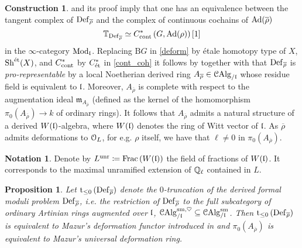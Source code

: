 \documentclass[10pt,a4paper]{amsart}
\numberwithin{equation}{subsection}
\theoremstyle{plain}
\newtheorem{prop}[theorem]{Proposition}
\theoremstyle{definition}
\newtheorem{notation}[theorem]{Notation}
\newtheorem{construction}[theorem]{Construction}
\theoremstyle{remark}
\numberwithin{equation}{section}
\begin{document}
\begin{construction}
\cite[Proposition 4.2.6]{me1} and its proof imply that one has an equivalence between the tangent complex of $\mathbf{\mathrm{Def}}_{\overline{\rho}}$ and the complex of continuous cochains of $\mathrm{Ad} ( \overline \rho)$
	\begin{equation} \label{cont_coh}
		\mathbb T_{\mathbf{\mathrm{Def}}_{\overline{\rho}}} \simeq C^*_{\mathrm{cont}} \left( G, \mathrm{Ad}( \rho ) \right)[1]
	\end{equation}
in the $\infty$-category $\mathrm{Mod}_\mathfrak l$. 
Replacing $\mathrm B G$ in \eqref{deform} by \'etale homotopy type of $X$, $\mathrm{Sh}^{\text{\'et}}(X)$, and $C^*_{\mathrm{cont}}$ by $C^*_{\text{\'et}}$ in \eqref{cont_coh} it follows by \cite[Theorem 19.1]{milne_et} together with \cite[Theorem 6.2.5]{lurieDAGXII} that $
\mathbf{\mathrm{Def}}_{\overline{\rho}}$ is \emph{pro-representable} by
a local Noetherian derived ring $A_{\overline{\rho}} \in \mathcal{C}\mathrm{Alg}_{/ \mathfrak l}$ whose residue field is equivalent to $\mathfrak l$. Moreover, $A_{\overline{\rho}}$ is complete with respect to the augmentation ideal $\mathfrak{m}_{A_{\overline{\rho}}}$
(defined as the kernel of the homomorphism $\pi_0 \left(  A_{\overline{\rho}} \right) \to k$ of ordinary rings).
It follows that $A_{\overline{\rho}}$ admits a natural structure of a derived $W(\mathfrak l)$-algebra, where $W(\mathfrak l)$ denotes the ring of Witt vector of $\mathfrak l$.
As $\overline{\rho}$ admits deformations to $\mathcal{O}_L$, for e.g. $\rho$ itself, we have that $\ell \neq 0 $ in $\pi_0(A_{\overline{\rho}})$.
\end{construction}

\begin{notation}
Denote by $L^{\mathrm{unr}} \coloneqq \mathrm{Frac} \left( W(\mathfrak l) \right)$ the field of fractions of $W(\mathfrak l)$. It corresponds to the maximal unramified extension of $\mathbb{Q}_\ell$ contained in $L$.
\end{notation}

\begin{prop}
Let $\mathrm t_{\leq 0} \left( \mathbf{\mathrm{Def}}_{\overline{\rho}} \right)$ denote the $0$-truncation of the derived formal moduli problem $\mathbf{\mathrm{Def}}_{\overline{\rho}}$, i.e. the restriction of $\mathbf{\mathrm{Def}}_{\overline{\rho}}$ to the full subcategory of ordinary Artinian rings augmented over $\mathfrak l$,
$\mathcal{C}\mathrm{Alg}_{/ \mathfrak l }^{\mathrm{sm},\heartsuit} \subseteq \mathcal{C}\mathrm{Alg}_{/ \mathfrak l}^{\mathrm{sm}}$.
Then $\mathrm t_{\leq 0} \left( \mathbf{\mathrm{Def}}_{\overline{\rho}} \right)$ is equivalent to Mazur's deformation functor introduced in \cite[Section 1.2]{mazurDG} and $\pi_0(A_{\overline{\rho}})$
is equivalent to Mazur's universal deformation ring.
\end{prop}
\end{document}
